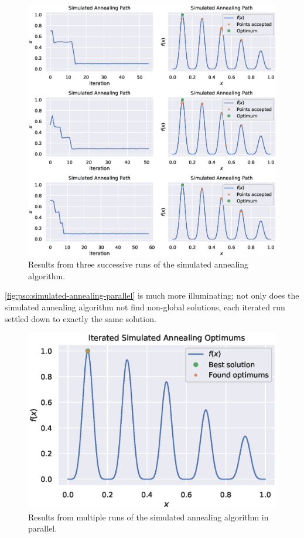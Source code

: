 \documentclass[12pt]{article}
\begin{document}
\begin{figure}[H]
    \centering
    \includegraphics[width=\textwidth]{figures/prob1-simulated-annealing-results.eps}
    \caption{Results from three successive runs of the simulated annealing algorithm.}\label{fig:pso:simulated-annealing-results}
\end{figure}

\autoref{fig:pso:simulated-annealing-parallel} is much more illuminating; not only does the simulated annealing algorithm not find non-global solutions, each iterated run settled down to exactly the same solution.

\begin{figure}[H]
    \centering
    \includegraphics{figures/prob1-simulated-annealing-solutions.eps}
    \caption{Results from multiple runs of the simulated annealing algorithm in parallel.}\label{fig:pso:simulated-annealing-parallel}
\end{figure}
\end{document}
